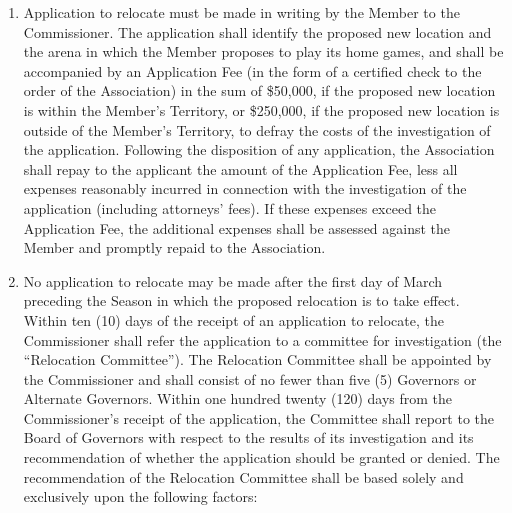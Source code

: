 \documentclass[]{book}
\providecommand{\tightlist}{%
  \setlength{\itemsep}{0pt}\setlength{\parskip}{0pt}}
\theoremstyle{definition}
\theoremstyle{definition}
\theoremstyle{definition}
\theoremstyle{remark}
\begin{document}
\begin{enumerate}
\def\labelenumi{(\alph{enumi})}
\tightlist
\item
  Application to relocate must be made in writing by the Member to the
  Commissioner. The application shall identify the proposed new location
  and the arena in which the Member proposes to play its home games, and
  shall be accompanied by an Application Fee (in the form of a certified
  check to the order of the Association) in the sum of \$50,000, if the
  proposed new location is within the Member's Territory, or \$250,000,
  if the proposed new location is outside of the Member's Territory, to
  defray the costs of the investigation of the application. Following
  the disposition of any application, the Association shall repay to the
  applicant the amount of the Application Fee, less all expenses
  reasonably incurred in connection with the investigation of the
  application (including attorneys' fees). If these expenses exceed the
  Application Fee, the additional expenses shall be assessed against the
  Member and promptly repaid to the Association.
\item
  No application to relocate may be made after the first day of March
  preceding the Season in which the proposed relocation is to take
  effect. Within ten (10) days of the receipt of an application to
  relocate, the Commissioner shall refer the application to a committee
  for investigation (the ``Relocation Committee''). The Relocation
  Committee shall be appointed by the Commissioner and shall consist of
  no fewer than five (5) Governors or Alternate Governors. Within one
  hundred twenty (120) days from the Commissioner's receipt of the
  application, the Committee shall report to the Board of Governors with
  respect to the results of its investigation and its recommendation of
  whether the application should be granted or denied. The
  recommendation of the Relocation Committee shall be based solely and
  exclusively upon the following factors:


\end{enumerate}
\end{document}
